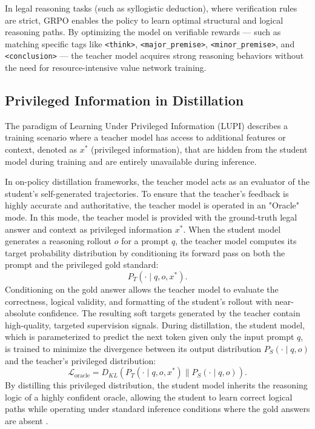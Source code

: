 In legal reasoning tasks (such as syllogistic deduction), where verification rules are strict, GRPO enables the policy to learn optimal structural and logical reasoning paths. By optimizing the model on verifiable rewards --- such as matching specific tags like \texttt{<think>}, \texttt{<major\_premise>}, \texttt{<minor\_premise>}, and \texttt{<conclusion>} --- the teacher model acquires strong reasoning behaviors without the need for resource-intensive value network training.

\subsection{Privileged Information in Distillation}

The paradigm of Learning Under Privileged Information (LUPI) describes a training scenario where a teacher model has access to additional features or context, denoted as $x^*$ (privileged information), that are hidden from the student model during training and are entirely unavailable during inference. 

In on-policy distillation frameworks, the teacher model acts as an evaluator of the student's self-generated trajectories. To ensure that the teacher's feedback is highly accurate and authoritative, the teacher model is operated in an "Oracle" mode. In this mode, the teacher model is provided with the ground-truth legal answer and context as privileged information $x^*$. When the student model generates a reasoning rollout $o$ for a prompt $q$, the teacher model computes its target probability distribution by conditioning its forward pass on both the prompt and the privileged gold standard:
\begin{equation}
    P_T(\cdot \mid q, o, x^*).
\end{equation}
Conditioning on the gold answer allows the teacher model to evaluate the correctness, logical validity, and formatting of the student's rollout with near-absolute confidence. The resulting soft targets generated by the teacher contain high-quality, targeted supervision signals. During distillation, the student model, which is parameterized to predict the next token given only the input prompt $q$, is trained to minimize the divergence between its output distribution $P_S(\cdot \mid q, o)$ and the teacher's privileged distribution:
\begin{equation}
    \mathcal{L}_{\text{oracle}} = D_{KL}\left( P_T(\cdot \mid q, o, x^*) \parallel P_S(\cdot \mid q, o) \right).
\end{equation}
By distilling this privileged distribution, the student model inherits the reasoning logic of a highly confident oracle, allowing the student to learn correct logical paths while operating under standard inference conditions where the gold answers are absent \parencite{li2026legaldrilldiagnosisdrivensynthesislegal, zhao2026trainingharnessesonpolicyharness}.
